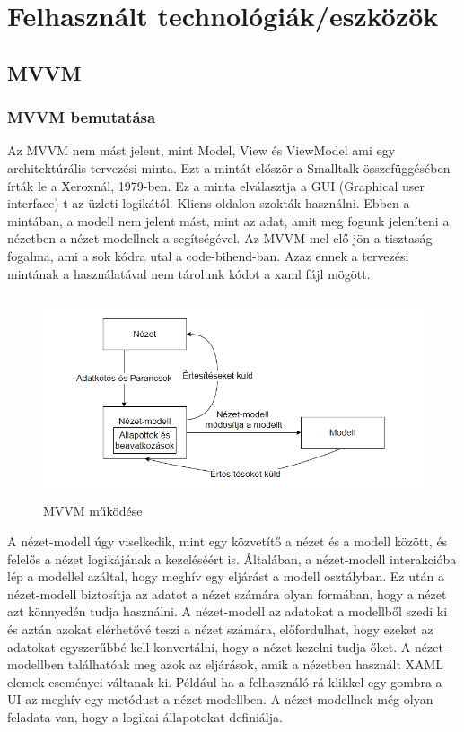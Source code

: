 \documentclass[
]{thesis-ekf}
\theoremstyle{definition}
\theoremstyle{remark}
\begin{document}
\chapter{Felhasznált technológiák/eszközök}
\section{MVVM}
\subsection{MVVM bemutatása}

Az MVVM nem mást jelent, mint Model, View és ViewModel ami egy architektúrális tervezési minta. Ezt a mintát először a Smalltalk összefüggésében írták le a Xeroxnál, 1979-ben. Ez a minta elválasztja a GUI (Graphical user interface)-t az üzleti logikától. Kliens oldalon szokták használni. Ebben a mintában, a modell nem jelent mást, mint az adat, amit meg fogunk jeleníteni a nézetben a nézet-modellnek a segítségével. Az MVVM-mel elő jön a tisztaság fogalma, ami a sok kódra utal a code-bihend-ban. Azaz ennek a tervezési mintának a használatával nem tárolunk kódot a xaml fájl mögött. 
\begin{figure}[ht!]
	\centering
	\includegraphics[height=6cm]{mvvmdiag}
	\caption[MVVM]{MVVM működése}
	\label{fig:mvvmdiag}
\end{figure}
A nézet-modell úgy viselkedik, mint egy közvetítő a nézet és a modell között, és felelős a nézet logikájának a kezeléséért is. Általában, a nézet-modell interakcióba lép a modellel azáltal, hogy meghív egy eljárást a modell osztályban. Ez után a nézet-modell biztosítja az adatot a nézet számára olyan formában, hogy a nézet azt könnyedén tudja használni. A nézet-modell az adatokat a modellből szedi ki és aztán azokat elérhetővé teszi a nézet számára, előfordulhat, hogy ezeket az adatokat egyszerűbbé kell konvertálni, hogy a nézet kezelni tudja őket. A nézet-modellben találhatóak meg azok az eljárások, amik a nézetben használt XAML elemek eseményei váltanak ki. Például ha a felhasználó rá klikkel egy gombra a UI az meghív egy metódust a nézet-modellben. A nézet-modellnek még olyan feladata van, hogy a logikai állapotokat definiálja.
\end{document}

